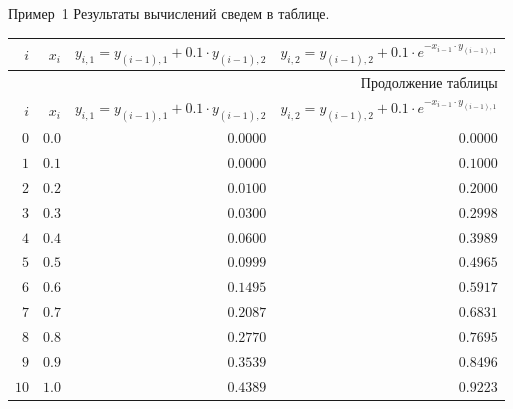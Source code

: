 \documentclass[aspectratio=169, mathserif]{beamer}	%
\begin{document}
\begin{frame}[fragile, label=c]{Пример~1}
\scriptsize
Результаты вычислений сведем в таблице.
\vfill
\renewcommand{\arraystretch}{1.5}
\begin{longtable}{|r|r|r|r|}

	\hline \multicolumn{1}{|r|}{$i$} & \multicolumn{1}{r|}{$x_i$} & \multicolumn{1}{r|}{$y_{i,1} = y_{(i-1),1} + 0.1 \cdot y_{(i-1),2}$} & \multicolumn{1}{r|}{$y_{i,2} = y_{(i-1),2} + 0.1 \cdot e^{-x_{i-1}\cdot y_{(i-1),1}}$}  \\
	\hline
	\endfirsthead

	\multicolumn{4}{r}{Продолжение таблицы \thetable{}} \\
	\hline
	\multicolumn{1}{|r|}{$i$} & \multicolumn{1}{r|}{$x_i$} & \multicolumn{1}{r|}{$y_{i,1} = y_{(i-1),1} + 0.1 \cdot y_{(i-1),2}$} & \multicolumn{1}{r|}{$y_{i,2} = y_{(i-1),2} + 0.1 \cdot e^{-x_{i-1}\cdot y_{(i-1),1}}$}  \\
	\hline
	\endhead

	$0$  &$0.0$ & $0.0000$ & $0.0000$  \\
	\hline

	$1$  &$0.1$ & $0.0000$ & $0.1000$  \\
	\hline

	$2$  &$0.2$ & $0.0100$ & $0.2000$  \\
	\hline

	$3$  &$0.3$ & $0.0300$ & $0.2998$ \\
	\hline

	$4$  &$0.4$ & $0.0600$ & $0.3989$  \\
	\hline

	$5$  &$0.5$ & $0.0999$ & $0.4965$  \\
	\hline

	$6$  &$0.6$ & $0.1495$ & $0.5917$  \\
	\hline

	$7$  &$0.7$ & $0.2087$ & $0.6831$  \\
	\hline

	$8$  &$0.8$ & $0.2770$ & $0.7695$  \\
	\hline

	$9$  &$0.9$ & $0.3539$ & $0.8496$  \\
	\hline

	$10$  &$1.0$ & $0.4389$ & $0.9223$  \\
	\hline
\end{longtable}
\vfill
\end{frame}
\end{document}
